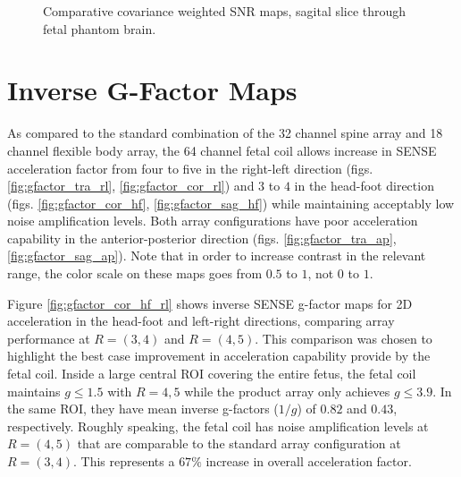 \begin{figure}
\caption{Comparative covariance weighted SNR maps, sagital slice through fetal phantom brain.}
\label{fig:SNR_sag}
\end{figure}

\section{Inverse G-Factor Maps}
As compared to the standard combination of the 32 channel spine array and 18 channel flexible body array, the 64 channel
fetal coil allows increase in SENSE acceleration factor from four to five in the right-left direction (figs.
\ref{fig:gfactor_tra_rl}, \ref{fig:gfactor_cor_rl}) and $3$ to $4$ in the head-foot direction (figs.
\ref{fig:gfactor_cor_hf}, \ref{fig:gfactor_sag_hf}) while maintaining acceptably low noise amplification levels. Both
array configurations have poor acceleration capability in the anterior-posterior direction (figs.
\ref{fig:gfactor_tra_ap}, \ref{fig:gfactor_sag_ap}). Note that in order to increase contrast in the relevant range, the
color scale on these maps goes from $0.5$ to $1$, not $0$ to $1$.

Figure \ref{fig:gfactor_cor_hf_rl} shows inverse SENSE g-factor maps for 2D acceleration in the head-foot and left-right
directions, comparing array performance at $R=(3,4)$ and $R=(4,5)$. This comparison was chosen to highlight the best
case improvement in acceleration capability provide by the fetal coil. Inside a large central ROI covering the entire
fetus, the fetal coil maintains $g\le1.5$ with $R=4,5$ while the product array only achieves $g\le3.9$. In the same ROI,
they have mean inverse g-factors ($1/g$) of $0.82$ and $0.43$, respectively. Roughly speaking, the fetal coil has noise
amplification levels at $R=(4,5)$ that are comparable to the standard array configuration at $R=(3,4)$. This represents
a $67\%$ increase in overall acceleration factor.

